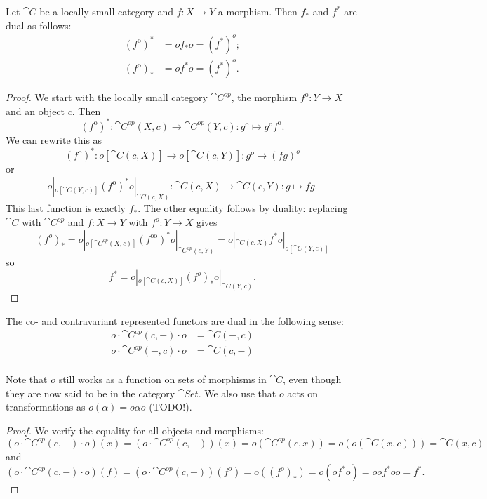 \begin{proposition}
Let $\cat{C}$ be a locally small category and $f: X\to Y$ a morphism. Then $f_*$ and $f^*$ are dual as follows:
\begin{align*}
(f^\text{o})^* &= of_*o = (f^*)^o; \\
(f^\text{o})_* &= of^*o = (f^*)^o.
\end{align*}
\end{proposition}
\begin{proof}
We start with the locally small category $\cat{C^{op}}$, the morphism $f^\text{o}: Y\to X$ and an object $c$. Then 
\[ (f^\text{o})^*: \cat{C^{op}}(X,c) \to \cat{C^{op}}(Y,c): g^\text{o} \mapsto g^\text{o}f^\text{o}. \]
We can rewrite this as
\[ (f^\text{o})^*: o[\cat{C}(c,X)] \to o[\cat{C}(c,Y)]: g^o \mapsto (fg)^o \]
or
\[ o|_{o[\cat{C}(Y,c)]}(f^\text{o})^*o|_{\cat{C}(c, X)}: \cat{C}(c,X) \to \cat{C}(c,Y): g \mapsto fg. \]
This last function is exactly $f_*$. The other equality follows by duality: replacing $\cat{C}$ with $\cat{C^{op}}$ and $f: X\to Y$ with $f^o: Y\to X$ gives
\[ (f^o)_* = o|_{o[\cat{C^{op}}(X,c)]}(f^\text{oo})^*o|_{\cat{C^{op}}(c, Y)} = o|_{\cat{C}(c,X)}f^*o|_{o[\cat{C}(Y,c)]} \]
so
\[ f^* =  o|_{o[\cat{C}(c,X)]}(f^o)_* o|_{\cat{C}(Y,c)}. \]
\end{proof}
\begin{corollary} \label{dualityRepresentedFunctors}
The co- and contravariant represented functors are dual in the following sense:
\begin{align*}
o\cdot \cat{C^{op}}(c,-) \cdot o &= \cat{C}(-,c) \\
o\cdot \cat{C^{op}}(-,c) \cdot o &= \cat{C}(c,-) \\
\end{align*}
\end{corollary}
Note that $o$ still works as a function on sets of morphisms in $\cat{C}$, even though they are now said to be in the category $\cat{Set}$. We also use that $o$ acts on transformations as $o(\alpha) = o\alpha o$ (TODO!).
\begin{proof}
We verify the equality for all objects and morphisms:
\[ (o\cdot \cat{C^{op}}(c,-) \cdot o)(x) = (o\cdot \cat{C^{op}}(c,-))(x) = o(\cat{C^{op}}(c,x)) = o(o(\cat{C}(x,c))) = \cat{C}(x,c) \]
and
\[ (o\cdot \cat{C^{op}}(c,-) \cdot o)(f) = (o\cdot \cat{C^{op}}(c,-))(f^o) = o((f^o)_*) =o(of^*o) = oof^*oo = f^*. \]
\end{proof}

